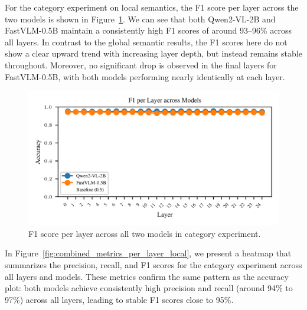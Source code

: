 \documentclass[11pt]{article}
\begin{document}
\noindent For the category experiment on local semantics, the F1 score per layer across the two models is shown in Figure~\ref{fig:f1_per_layer_local}.
We can see that both Qwen2-VL-2B and FastVLM-0.5B maintain a consistently high F1 scores of around 93--96\% across all layers.
In contrast to the global semantic results, the F1 scores here do not show a clear upward trend with increasing layer depth, but instead remains stable throughout.
Moreover, no significant drop is observed in the final layers for FastVLM-0.5B, with both models performing nearly identically at each layer.
\begin{figure}[H]
    \centering
    \includegraphics[width=1\linewidth]{figures/local/_combined_exp2/f1_lines_per_layer.png}
    \caption{F1 score per layer across all two models in category experiment.}
    \label{fig:f1_per_layer_local}
\end{figure}
\noindent In Figure~\ref{fig:combined_metrics_per_layer_local}, we present a heatmap that summarizes the precision, recall, and F1 scores for the category experiment across all layers and models.
These metrics confirm the same pattern as the accuracy plot: both models achieve consistently high precision and recall (around 94\% to 97\%) across all layers, leading to stable F1 scores close to 95\%.
\end{document}
